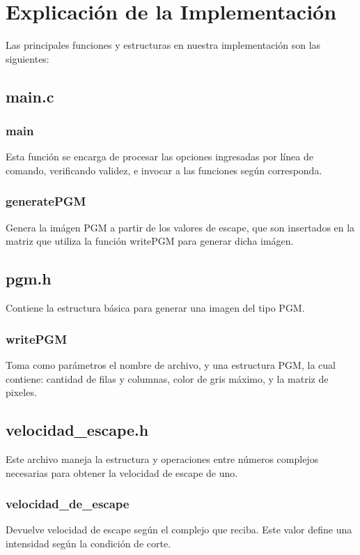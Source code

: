 \documentclass[a4paper,10pt]{article}
\begin{document}
\section{Explicaci\'on de la Implementaci\'on}
Las principales funciones y estructuras en nuestra implementaci\'on son las siguientes:

\subsection{main.c}


\subsubsection{main}
Esta funci\'on se encarga de procesar las opciones ingresadas por l\'inea de comando, verificando validez, e invocar a las funciones  seg\'un corresponda.

\subsubsection{generatePGM}
Genera la im\'agen PGM a partir de los valores de escape, que son insertados en la matriz que utiliza la funci\'on writePGM para generar dicha im\'agen.

\subsection{pgm.h}
Contiene la estructura b\'asica para generar una imagen del tipo PGM.

\subsubsection{writePGM}
Toma como par\'ametros el nombre de archivo, y una estructura PGM, la cual contiene: cantidad de filas y columnas, color de gris m\'aximo, y la matriz de pixeles.

\subsection{velocidad\_escape.h}
Este archivo maneja la estructura y operaciones entre n\'umeros complejos necesarias para obtener la velocidad de escape de uno.

\subsubsection{velocidad\_de\_escape}
Devuelve velocidad de escape seg\'un el complejo que reciba. Este valor define una intensidad seg\'un la condici\'on de corte.
\end{document}
